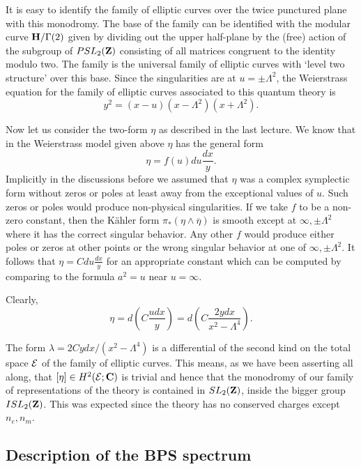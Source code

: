 \documentclass[10pt]{article}
\begin{document}
It is easy to identify the family of elliptic curves over the twice
punctured plane with this monodromy.  The base of the family can be
identified with
the modular curve ${\bf H}/\Gamma(2)$ given by dividing
out the upper half-plane by the (free) action of the subgroup of
$PSL_2({\bf Z})$ consisting of all matrices congruent to the identity
modulo two.
The family  is the universal family of
elliptic curves with `level two structure' over this base.
Since the singularities 
are at $u=\pm\Lambda^2$, the Weierstrass equation for the
family of elliptic curves associated to this quantum theory is 
$$y^2=(x-u)(x-\Lambda^2)(x+\Lambda^2).$$




Now let us consider the  two-form $\eta$ as described in the last
lecture. We know that in the Weierstrass model given above $\eta$ has
the general form 
$$\eta=f(u)du\frac{dx}{y}.$$
Implicitly in the discussions before we assumed that $\eta$ was a
complex symplectic form without zeros or poles at least away from the
exceptional values of $u$. Such zeros or poles
would produce non-physical singularities.
If we take $f$ to be a non-zero constant, then the K\"ahler form
$\pi_*(\eta\wedge \overline\eta)$ is smooth except at $\infty,\pm
\Lambda^2$ where it has the correct singular behavior.  Any other $f$ would
produce either poles or zeros at other points or the wrong singular
behavior at one of $\infty,\pm\Lambda^2$.
It follows that $\eta=Cdu\frac{dx}{y}$ for an appropriate constant
which can be computed by comparing to the formula $a^2=u$ near
$u=\infty$. 

Clearly,
$$\eta=d\left(C\frac{udx}{y}\right)=
d\left(C\frac{2ydx}{x^2-\Lambda^4}\right).$$ 

The form $\lambda=2Cydx/(x^2-\Lambda^4)$
is a differential of the second 
kind on the total space ${\cal E}$ of the family of elliptic curves.
This means, as we have been asserting all along, that $[\eta]\in
H^2({\cal E};{\bf C})$ is trivial and hence that 
the monodromy of
our family of representations of the theory is contained in $SL_2({\bf
Z})$, inside the bigger group $ISL_2({\bf Z})$. This was expected
since  the theory has no  conserved charges except $n_e,n_m$. 

\subsection{Description of the BPS spectrum}
\end{document}
